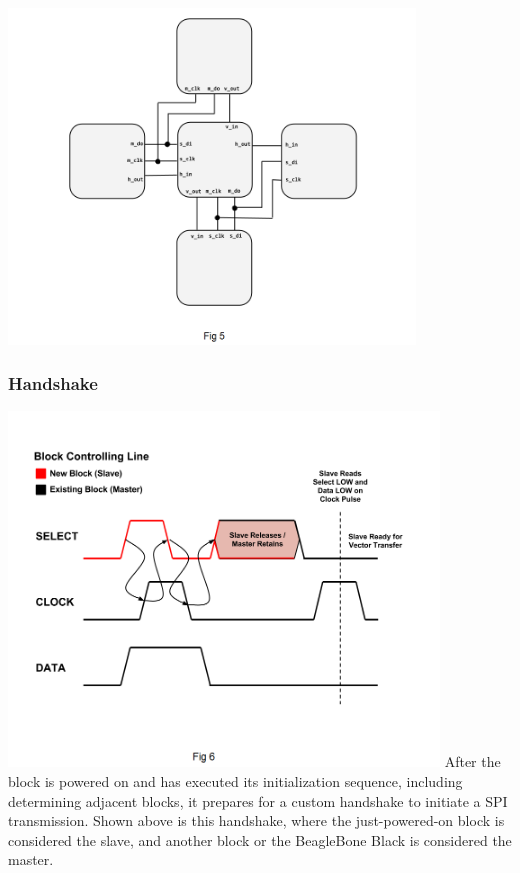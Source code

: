 \documentclass[12pt,a4paper]{article}
\begin{document}
 \includegraphics[width=4.25in]{BD.png}
 \subsubsection{Handshake}
\includegraphics[width=4.5in]{HS.png} \newpage 
 After the block is powered on and has executed its initialization sequence, including determining adjacent blocks, it prepares for a custom handshake to initiate a SPI transmission. Shown above is this handshake, where the just-powered-on block is considered the slave, and another block or the BeagleBone Black is considered the master. 
 
\end{document}
